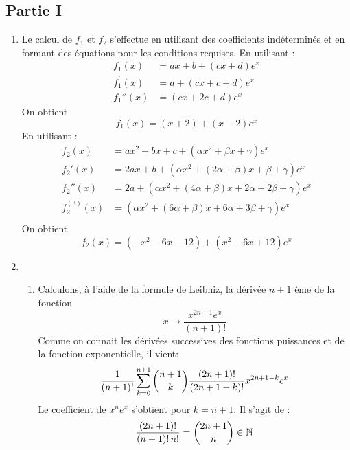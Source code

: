 \subsection*{Partie I}
\begin{enumerate}
 \item Le calcul de $f_1$ et $f_2$ s'effectue en utilisant des coefficients indéterminés et en formant des équations pour les conditions requises. En utilisant :
\begin{align*}
 f_1(x)&= ax+b +(cx+d)e^x \\
f_1^\prime (x)&= a+(cx+c+d)e^x \\
f_1''(x)& = (cx+2c+d)e^x
\end{align*}
On obtient
\begin{displaymath}
 f_1(x)= (x+2) +(x-2)e^x
\end{displaymath}
 En utilisant :
\begin{align*}
 f_2(x)&= ax^2+bx+c +(\alpha x^2+\beta x +\gamma)e^x \\
f_2'(x)&= 2ax+b +(\alpha x^2+(2\alpha + \beta) x +\beta + \gamma)e^x \\
f_2''(x)&= 2a +(\alpha x^2+(4\alpha +\beta) x +2\alpha +2\beta+\gamma)e^x \\
f_2^{(3)}(x)&= (\alpha x^2+(6\alpha +\beta) x + 6\alpha +3\beta+\gamma)e^x \\
\end{align*}
On obtient
\begin{displaymath}
 f_2(x)= (-x^2 -6x -12) +(x^2-6x+12)e^x
\end{displaymath}
\item \begin{enumerate}
 \item Calculons, à l'aide de la formule de Leibniz, la dérivée $n+1$ ème de la fonction
\[x \rightarrow \frac{x^{2n+1}e^x}{(n+1)!}\]
Comme on connait les dérivées successives des fonctions puissances et de la fonction exponentielle, il vient:
\begin{displaymath}
 \dfrac{1}{(n+1)!}\sum_{k=0}^{n+1}\dbinom{n+1}{k}\dfrac{(2n+1)!}{(2n+1-k)!}x^{2n+1-k}e^{x}
\end{displaymath}
Le coefficient de $x^ne^x$ s'obtient pour $k=n+1$. Il s'agit de :
\begin{displaymath}
 \dfrac{(2n+1)!}{(n+1)!\, n!} = \dbinom{2n+1}{n} \in \mathbb{N}
\end{displaymath}


\end{enumerate}
\end{enumerate}
